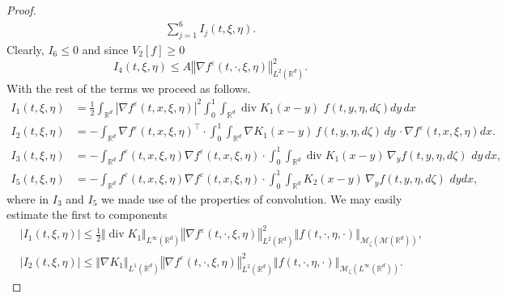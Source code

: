 \documentclass[10pt]{article}
\def\divv{\operatorname {div}}
\newcommand*{\norm}[1]{\left\Vert{#1}\right\Vert}
\newcommand*{\abs}[1]{\left\vert{#1}\right\vert}
\newcommand{\ve}{\varepsilon}
\newcommand{\R}{\mathbb{R}}
\newcommand{\izj}{\int_{0}^{1}}
\newcommand{\ird}{\int_{\mathbb{R}^d}}
\newcommand{\W}{\mathcal{W}}
\begin{document}
\begin{proof}
\begin{align}
\sum_{j=1}^6 I_j(t,\xi,\eta).
\end{align}
Clearly, $I_6 \leq 0$ and since $V_2[f] \geq 0$
\[
I_4(t,\xi,\eta) \leq A\norm{\nabla f^\ve(t,\cdot,\xi,\eta)}^2_{L^{2}(\R^d)}.
\]
With the rest of the terms we proceed as follows. 
\begin{align*}
I_1(t,\xi,\eta)&=\frac{1}{2}\ird |\nabla f^\ve(t,x,\xi,\eta)|^2\int_0^1\int_{\R^{d}}\divv K_1(x-y)\,\,f(t,y,\eta,d\zeta)dy\,dx \\
I_2(t,\xi,\eta)&=- \ird\nabla f^\ve(t,x,\xi,\eta)^\top\cdot  \int_0^1 \ird \nabla K_1(x-y)\, f(t,y,\eta,d\zeta) \,dy\,  \cdot \nabla f^\ve(t,x,\xi,\eta) dx.\\
I_3(t,\xi,\eta)&=- \int_{\R^{d}} f^\ve(t,x,\xi,\eta)\nabla f^\ve(t,x,\xi,\eta) \cdot\izj \ird \divv K_1(x-y)\,\nabla_y f(t,y,\eta,d\zeta)\,\, dy\,dx,\\
I_5(t,\xi,\eta)&=- \int_{\R^{d}} f^\ve(t,x,\xi,\eta)\nabla f^\ve(t,x,\xi,\eta) \cdot  \izj \ird K_2(x-y)\, \nabla_y f(t,y,\eta,d \zeta)\,\, dy dx,
\end{align*}
where in $I_3$ and $I_5$ we made use of the properties of convolution.
We may easily estimate the first to components
\begin{align*}
 &\abs{I_1(t,\xi,\eta)} \leq 
\frac{1}{2}\Vert \divv K_1\Vert_{L^\infty(\R^d)}\norm{\nabla f^\ve(t,\cdot,\xi,\eta)}_{L^{2}(\R^d)}^2 \norm{f(t,\cdot,\eta,\cdot)}_{\mathcal{M}_{\zeta}(\mathcal{M}(\R^d))},\\
&\abs{I_2(t,\xi,\eta)} \leq \Vert \nabla K_1\Vert_{L^1(\R^d)}\norm{\nabla f^\ve(t,\cdot,\xi,\eta)}_{L^{2}(\R^d)}^2 \norm{f(t,\cdot,\eta,\cdot)}_{\mathcal{M}_{\zeta}(L^{\infty}(\R^d))}.
\end{align*}



\end{proof}
\end{document}
